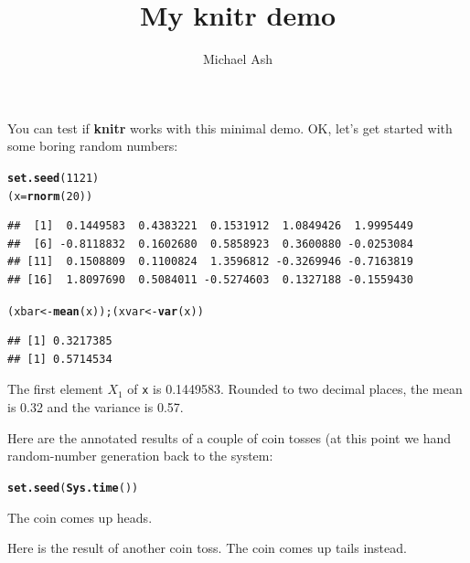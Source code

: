 \documentclass{article}\usepackage[]{graphicx}\usepackage[]{color}
\makeatletter
\newcommand{\hlnum}[1]{\textcolor[rgb]{0.686,0.059,0.569}{#1}}%
\newcommand{\hlstd}[1]{\textcolor[rgb]{0.345,0.345,0.345}{#1}}%
\newcommand{\hlkwb}[1]{\textcolor[rgb]{0.69,0.353,0.396}{#1}}%
\newcommand{\hlkwd}[1]{\textcolor[rgb]{0.737,0.353,0.396}{\textbf{#1}}}%
\newenvironment{kframe}{%
 \def\at@end@of@kframe{}%
 \ifinner\ifhmode%
  \def\at@end@of@kframe{\end{minipage}}%
  \begin{minipage}{\columnwidth}%
 \fi\fi%
 \def\FrameCommand##1{\hskip\@totalleftmargin \hskip-\fboxsep
 \colorbox{shadecolor}{##1}\hskip-\fboxsep
     \hskip-\linewidth \hskip-\@totalleftmargin \hskip\columnwidth}%
 \MakeFramed {\advance\hsize-\width
   \@totalleftmargin\z@ \linewidth\hsize
   \@setminipage}}%
 {\par\unskip\endMakeFramed%
 \at@end@of@kframe}
\newenvironment{knitrout}{}{} %
\makeatother
\begin{document}
\title{My knitr demo}
\author{Michael Ash}
\maketitle

You can test if \textbf{knitr} works with this minimal demo. OK, let's
get started with some boring random numbers:

\begin{knitrout}
\color{fgcolor}\begin{kframe}
\begin{alltt}
\hlkwd{set.seed}\hlstd{(}\hlnum{1121}\hlstd{)}
\hlstd{(x}\hlkwb{=}\hlkwd{rnorm}\hlstd{(}\hlnum{20}\hlstd{))}
\end{alltt}
\begin{verbatim}
##  [1]  0.1449583  0.4383221  0.1531912  1.0849426  1.9995449
##  [6] -0.8118832  0.1602680  0.5858923  0.3600880 -0.0253084
## [11]  0.1508809  0.1100824  1.3596812 -0.3269946 -0.7163819
## [16]  1.8097690  0.5084011 -0.5274603  0.1327188 -0.1559430
\end{verbatim}
\begin{alltt}
\hlstd{(xbar}  \hlkwb{<-} \hlkwd{mean}\hlstd{(x)); (xvar}  \hlkwb{<-} \hlkwd{var}\hlstd{(x))}
\end{alltt}
\begin{verbatim}
## [1] 0.3217385
## [1] 0.5714534
\end{verbatim}
\end{kframe}
\end{knitrout}

The first element $X_1$ of \texttt{x} is 0.1449583. Rounded to two decimal places, the mean is 0.32 and the variance is 0.57.

Here are the annotated results of a couple of coin tosses (at this
point we hand random-number generation back to the system:
\begin{knitrout}
\color{fgcolor}\begin{kframe}
\begin{alltt}
\hlkwd{set.seed}\hlstd{(}\hlkwd{Sys.time}\hlstd{())}
\end{alltt}
\end{kframe}
\end{knitrout}



The coin comes up heads.



Here is the result of another coin toss.  The coin comes up tails instead.
\end{document}
